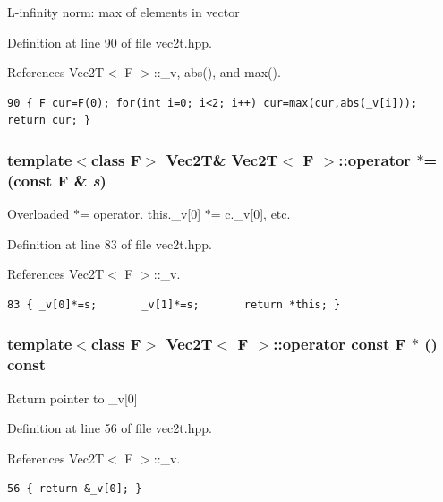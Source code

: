 L-infinity norm: max of elements in vector 

Definition at line 90 of file vec2t.hpp.

References Vec2T$<$ F $>$::\_\-v, abs(), and max().

\footnotesize\begin{verbatim}90 { F cur=F(0); for(int i=0; i<2; i++) cur=max(cur,abs(_v[i])); return cur; }
\end{verbatim}\normalsize 


\subsubsection{\setlength{\rightskip}{0pt plus 5cm}template$<$class F$>$ {\bf Vec2T}\& {\bf Vec2T}$<$ F $>$::operator $\ast$= (const F \& {\em s})\hspace{0.3cm}{\tt  [inline]}}\label{classVec2T_404673cf6ccdc8cbaa386ee62bda9ee3_404673cf6ccdc8cbaa386ee62bda9ee3}


Overloaded $\ast$= operator. this.\_\-v[0] $\ast$= c.\_\-v[0], etc. 

Definition at line 83 of file vec2t.hpp.

References Vec2T$<$ F $>$::\_\-v.

\footnotesize\begin{verbatim}83 { _v[0]*=s;       _v[1]*=s;       return *this; }
\end{verbatim}\normalsize 


\subsubsection{\setlength{\rightskip}{0pt plus 5cm}template$<$class F$>$ {\bf Vec2T}$<$ F $>$::operator const F $\ast$ () const\hspace{0.3cm}{\tt  [inline]}}\label{classVec2T_fa3f101185e97bac2b0f08d3588ae2f4_fa3f101185e97bac2b0f08d3588ae2f4}


Return pointer to \_\-v[0] 

Definition at line 56 of file vec2t.hpp.

References Vec2T$<$ F $>$::\_\-v.

\footnotesize\begin{verbatim}56 { return &_v[0]; }
\end{verbatim}\normalsize 


